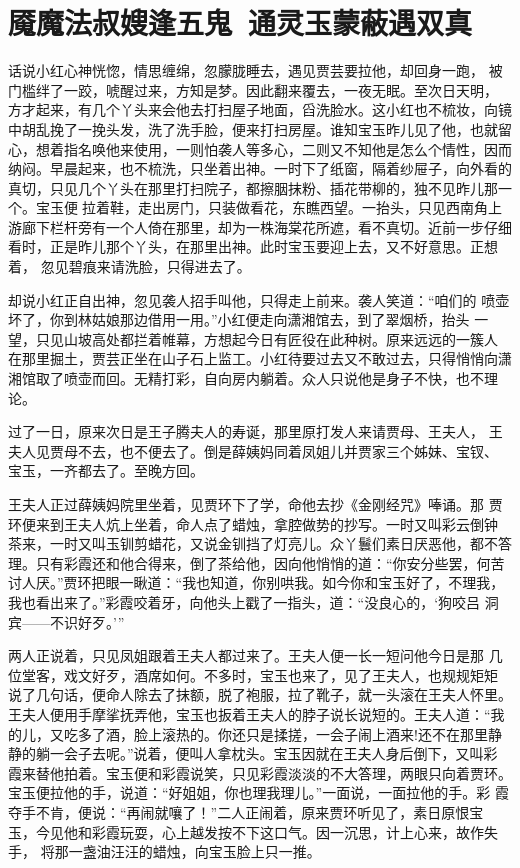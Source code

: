 \chapter{魇魔法叔嫂逢五鬼~通灵玉蒙蔽遇双真}

话说小红心神恍惚，情思缠绵，忽朦胧睡去，遇见贾芸要拉他，却回身一跑，
被门槛绊了一跤，唬醒过来，方知是梦。因此翻来覆去，一夜无眠。至次日天明，
方才起来，有几个丫头来会他去打扫屋子地面，舀洗脸水。这小红也不梳妆，向镜
中胡乱挽了一挽头发，洗了洗手脸，便来打扫房屋。谁知宝玉昨儿见了他，也就留
心，想着指名唤他来使用，一则怕袭人等多心，二则又不知他是怎么个情性，因而
纳闷。早晨起来，也不梳洗，只坐着出神。一时下了纸窗，隔着纱屉子，向外看的
真切，只见几个丫头在那里打扫院子，都擦胭抹粉、插花带柳的，独不见昨儿那一
个。宝玉便拉着鞋，走出房门，只装做看花，东瞧西望。一抬头，只见西南角上
游廊下栏杆旁有一个人倚在那里，却为一株海棠花所遮，看不真切。近前一步仔细
看时，正是昨儿那个丫头，在那里出神。此时宝玉要迎上去，又不好意思。正想着，
忽见碧痕来请洗脸，只得进去了。

却说小红正自出神，忽见袭人招手叫他，只得走上前来。袭人笑道：“咱们的
喷壶坏了，你到林姑娘那边借用一用。”小红便走向潇湘馆去，到了翠烟桥，抬头
一望，只见山坡高处都拦着帷幕，方想起今日有匠役在此种树。原来远远的一簇人
在那里掘土，贾芸正坐在山子石上监工。小红待要过去又不敢过去，只得悄悄向潇
湘馆取了喷壶而回。无精打彩，自向房内躺着。众人只说他是身子不快，也不理论。

过了一日，原来次日是王子腾夫人的寿诞，那里原打发人来请贾母、王夫人，
王夫人见贾母不去，也不便去了。倒是薛姨妈同着凤姐儿并贾家三个姊妹、宝钗、
宝玉，一齐都去了。至晚方回。

王夫人正过薛姨妈院里坐着，见贾环下了学，命他去抄《金刚经咒》唪诵。那
贾环便来到王夫人炕上坐着，命人点了蜡烛，拿腔做势的抄写。一时又叫彩云倒钟
茶来，一时又叫玉钏剪蜡花，又说金钏挡了灯亮儿。众丫鬟们素日厌恶他，都不答
理。只有彩霞还和他合得来，倒了茶给他，因向他悄悄的道：“你安分些罢，何苦
讨人厌。”贾环把眼一瞅道：“我也知道，你别哄我。如今你和宝玉好了，不理我，
我也看出来了。”彩霞咬着牙，向他头上戳了一指头，道：“没良心的，‘狗咬吕
洞宾——不识好歹。’”

两人正说着，只见凤姐跟着王夫人都过来了。王夫人便一长一短问他今日是那
几位堂客，戏文好歹，酒席如何。不多时，宝玉也来了，见了王夫人，也规规矩矩
说了几句话，便命人除去了抹额，脱了袍服，拉了靴子，就一头滚在王夫人怀里。
王夫人便用手摩挲抚弄他，宝玉也扳着王夫人的脖子说长说短的。王夫人道：“我
的儿，又吃多了酒，脸上滚热的。你还只是揉搓，一会子闹上酒来!还不在那里静
静的躺一会子去呢。”说着，便叫人拿枕头。宝玉因就在王夫人身后倒下，又叫彩
霞来替他拍着。宝玉便和彩霞说笑，只见彩霞淡淡的不大答理，两眼只向着贾环。
宝玉便拉他的手，说道：“好姐姐，你也理我理儿。”一面说，一面拉他的手。彩
霞夺手不肯，便说：“再闹就嚷了！”二人正闹着，原来贾环听见了，素日原恨宝
玉，今见他和彩霞玩耍，心上越发按不下这口气。因一沉思，计上心来，故作失手，
将那一盏油汪汪的蜡烛，向宝玉脸上只一推。

